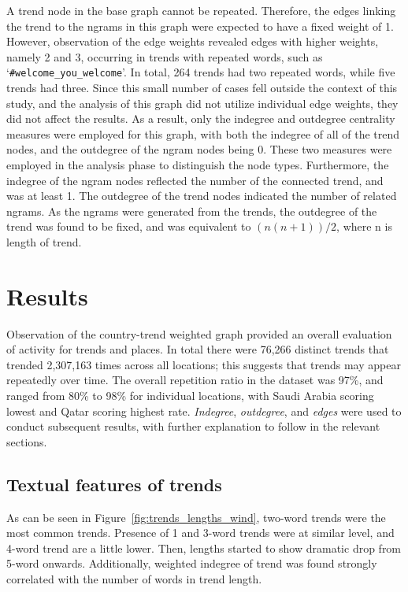 \documentclass{comjnl}
\begin{document}
A trend node in the base graph cannot be repeated. Therefore, the edges linking the trend to the ngrams in this graph were expected to have a fixed weight of 1.  However, observation of the edge weights revealed edges with higher weights, namely 2 and 3, occurring in trends with repeated words, such as `{\texttt{\#welcome\_you\_welcome}}'.  In total, 264 trends had two repeated words, while five trends had three. Since this small number of cases fell outside the context of this study, and the analysis of this graph did not utilize individual edge weights, they did not affect the results. As a result, only the indegree and outdegree centrality measures were employed for this graph, with both the indegree of all of the trend nodes, and the outdegree of the ngram nodes being 0. These two measures were employed in the analysis phase to distinguish the node types. Furthermore, the indegree of the ngram nodes reflected the number of the connected trend, and was at least 1. The outdegree of the trend nodes indicated the number of related ngrams. As the ngrams were generated from the trends, the outdegree of the trend was found to be fixed, and was equivalent to $(n(n+1))/2$, where n is length of trend.

\section{Results}\label{results}

Observation of the country-trend weighted graph provided an overall evaluation of activity for trends and places. In total there were 76,266 distinct trends that trended 2,307,163 times across all locations; this suggests that trends may appear repeatedly over time. The overall repetition ratio in the dataset was 97\%, and ranged from 80\% to 98\% for individual locations, with Saudi Arabia scoring lowest and Qatar scoring highest rate. {\emph{Indegree}}, {\emph{outdegree}}, and {\emph{edges}} were used to conduct subsequent results, with further explanation to follow in the relevant sections.

\subsection{Textual features of trends}

As can be seen in Figure~\ref{fig:trends_lengths_wind}, two-word trends were the most common trends. Presence of 1 and 3-word trends were at similar level, and 4-word trend are a little lower. Then, lengths started to show dramatic drop from 5-word onwards. Additionally, weighted indegree of trend was found strongly correlated with the number of words in trend length.
\end{document}
